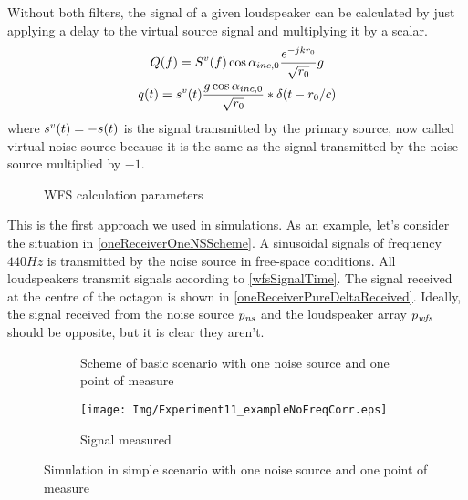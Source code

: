 Without both filters, the signal of a given loudspeaker can be calculated by just applying a delay to the virtual source signal and multiplying it by a scalar.
\begin{gather}
\signal[wfs][frequency](f) = \signal[nsVirt][frequency](f) \cos\normPrimaryPropAngleSection \frac{e^{-jk\distLinePrimSource}}{\sqrt{\distLinePrimSource}} g
\\
\signal[wfs][time](t) = \signal[nsVirt][time](t) \frac{g \cos\normPrimaryPropAngleSection}{\sqrt{\distLinePrimSource}}
\ast\delta(t - \distLinePrimSource/c)
\label{wfsSignalTime}
\end{gather}
where $\signal[nsVirt][time](t) = -\signal[ns][time](t)$ is the signal transmitted by the primary source, now called virtual noise source because it is the same as the signal transmitted by the noise source multiplied by $-1$.
\begin{figure}
	\centering
	\def\svgwidth{0.4\columnwidth}
	\graphicspath{{Img/}}
	
	\caption[WFS calculation parameters]{WFS calculation parameters}
	\label{figAngleCondition}
\end{figure}

This is the first approach we used in simulations. As an example, let's consider the situation in \autoref{oneReceiverOneNSScheme}. A sinusoidal signals of frequency $440 \si{Hz}$ is transmitted by the noise source in free-space conditions. All loudspeakers transmit signals according to \autoref{wfsSignalTime}. The signal received at the centre of the octagon is shown in \autoref{oneReceiverPureDeltaReceived}. Ideally, the signal received from the noise source $\Field[ns][time]$ and the loudspeaker array $\Field[wfs][time]$ should be opposite, but it is clear they aren't.

\begin{figure}
	\centering
	\begin{subfigure}[c]{0.45\textwidth}
	\centering
	\caption[Scheme of basic scenario]{Scheme of basic scenario with one noise source and one point of measure}
	\label{oneReceiverOneNSScheme}
	\end{subfigure}
	\begin{subfigure}[c]{0.45\textwidth}
		\centering
		\texttt{[image: Img/Experiment11\_exampleNoFreqCorr.eps]}
		\caption{Signal measured}
		\label{oneReceiverPureDeltaReceived}
	\end{subfigure}
	\caption{Simulation in simple scenario with one noise source and one point of measure}
\end{figure}

